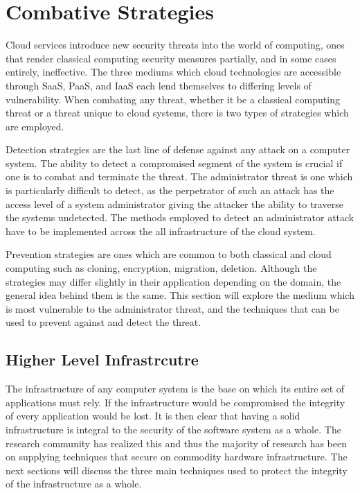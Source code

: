 \section{Combative Strategies}
\label{overview}

Cloud services introduce new security threats into the world of computing, ones that render classical computing security measures partially, and in some cases entirely, ineffective. The three mediums which cloud technologies are accessible through SaaS, PaaS, and IaaS each lend themselves to differing levels of vulnerability. When combating any threat, whether it be a classical computing threat or a threat unique to cloud systems, there is two types of strategies which are employed.

Detection strategies are the last line of defense against any attack on a computer system. The ability to detect a compromised segment of the system is crucial if one is to combat and terminate the threat. The administrator threat is one which is particularly difficult to detect, as the perpetrator of such an attack has the access level of a system administrator giving the attacker the ability to traverse the systems undetected. The methods employed to detect an administrator attack have to be implemented across the all infrastructure of the cloud system.

Prevention strategies are ones which are common to both classical and cloud computing such as cloning, encryption, migration, deletion. Although the strategies may differ slightly in their application depending on the domain, the general idea behind them is the same.
This section will explore the medium which is most vulnerable to the administrator threat, and the techniques that can be used to prevent against and detect the threat.


\subsection{Higher Level Infrastrcutre}
\label{hlInfrastructure}

The infrastructure of any computer system is the base on which its entire set of applications must rely. If the infrastructure would be compromised the integrity of every application would be lost. It is then clear that having a solid infrastructure is integral to the security of the software system as a whole. The research community has realized this and thus the majority of research has been on supplying techniques that secure on commodity hardware infrastructure. The next sections will discuss the three main techniques used to protect the integrity of the infrastructure as a whole.

